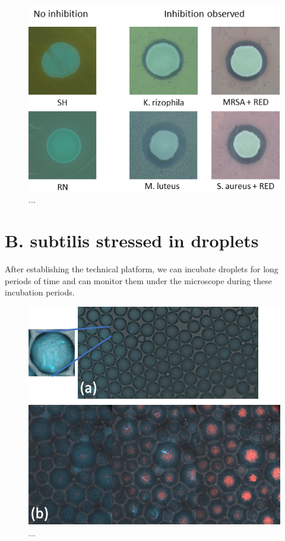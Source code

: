 \begin{figure}
\centering
\includegraphics[width=\linewidth]{graphics/2025_09_28_droplets_fig4.png}
\caption{...}
\label{fig:results_sensitive_screening}
\end{figure}

\section{B. subtilis stressed in droplets}
After establishing the technical platform, we can incubate droplets for long periods of time and can monitor them under the microscope during these incubation periods.

\begin{figure}
\centering
\includegraphics[width=\linewidth]{graphics/2025_09_28_droplets_fig5.png}
\caption{...}
\label{fig:results_incubation_subtilis}
\end{figure}

